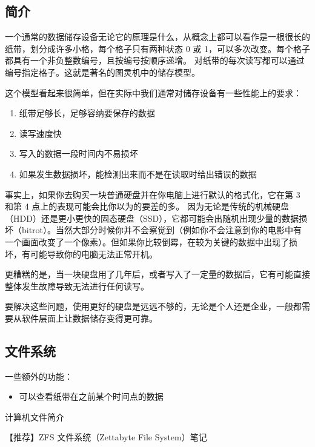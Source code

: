 
\begin{issues}
\issueDraft
\end{issues}

\subsection{简介}
一个通常的数据储存设备无论它的原理是什么，从概念上都可以看作是一根很长的纸带，划分成许多小格，每个格子只有两种状态 0 或 1，可以多次改变。每个格子都具有一个非负整数编号，且按编号按顺序递增。 对纸带的每次读写都可以通过编号指定格子。这就是著名的图灵机中的储存模型。

这个模型看起来很简单，但在实际中我们通常对储存设备有一些性能上的要求：
\begin{enumerate}
\item 纸带足够长，足够容纳要保存的数据
\item 读写速度快
\item 写入的数据一段时间内不易损坏
\item 如果发生数据损坏，能检测出来而不是在读取时给出错误的数据
\end{enumerate}

事实上，如果你去购买一块普通硬盘并在你电脑上进行默认的格式化，它在第 3 和第 4 点上的表现可能会比你以为的要差的多。 因为无论是传统的机械硬盘（HDD）还是更小更快的固态硬盘（SSD），它都可能会出随机出现少量的数据损坏（bitrot）。当然大部分时候你并不会察觉到（例如你不会注意到你的电影中有一个画面改变了一个像素）。但如果你比较倒霉，在较为关键的数据中出现了损坏，有可能导致你的电脑无法正常开机。

更糟糕的是，当一块硬盘用了几年后，或者写入了一定量的数据后，它有可能直接整体发生故障导致无法进行任何读写。

要解决这些问题，使用更好的硬盘是远远不够的，无论是个人还是企业，一般都需要从软件层面上让数据储存变得更可靠。

\subsection{文件系统}
一些额外的功能：
\begin{itemize}
\item 可以查看纸带在之前某个时间点的数据
\end{itemize}

计算机文件简介

【推荐】ZFS 文件系统（Zettabyte File System）笔记

